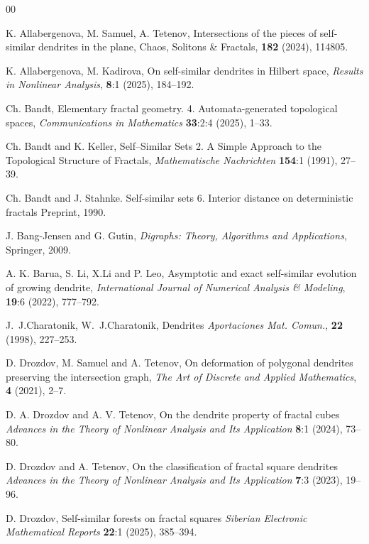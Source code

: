 \documentclass[11pt,reqno]{amsart}
\begin{document}
\begin{thebibliography}{00}

 K. Allabergenova, M. Samuel, A. Tetenov,
 {Intersections of the pieces of self-similar dendrites in the plane},
 {Chaos, Solitons \& Fractals}, \textbf{182} (2024), 114805.

 K. Allabergenova, M. Kadirova,
 {On self-similar dendrites in Hilbert space},
 \emph{Results in Nonlinear Analysis}, \textbf{8}:1 (2025), 184--192.

 Ch. Bandt,
 {Elementary fractal geometry. 4. Automata-generated topological spaces},
 \emph{Communications in Mathematics} \textbf{33}:2:4 (2025), 1--33.

 Ch. Bandt and K. Keller,
 {Self--Similar Sets 2. A Simple Approach to the Topological Structure of Fractals},
 \emph{Mathematische Nachrichten} \textbf{154}:1 (1991), 27--39.

Ch. Bandt and J. Stahnke. { Self-similar sets 6. Interior distance on deterministic fractals}  Preprint, 1990.

  J. Bang-Jensen and G. Gutin, 
 \emph{Digraphs: Theory, Algorithms and Applications},
 Springer, 2009.

 A. K. Barua, S. Li, X.Li and P. Leo,
 {Asymptotic and exact self-similar evolution of growing dendrite},
 \emph{International Journal of Numerical Analysis \& Modeling}, \textbf{19}:6 (2022), 777--792.

J.~J.Charatonik, W.~J.Charatonik, { Dendrites} \emph{Aportaciones Mat. Comun.}, \textbf{22} (1998), 227--253.


 D. Drozdov, M. Samuel and A. Tetenov,
 {On deformation of polygonal dendrites preserving the intersection graph},
 \emph{The Art of Discrete and Applied Mathematics}, \textbf{4} (2021),  2--7.

 D. A. Drozdov and A. V. Tetenov, 
 {On the dendrite property of fractal cubes} 
 \emph{Advances in the Theory of Nonlinear Analysis and Its Application} \textbf{8}:1 (2024), 73--80.

 D. Drozdov and A. Tetenov, 
 {On the classification of fractal square dendrites}
 \emph{Advances in the Theory of Nonlinear Analysis and Its Application} \textbf{7}:3 (2023), 19--96.

 D. Drozdov, 
 {Self-similar forests on fractal squares}
 \emph{Siberian Electronic Mathematical Reports} \textbf{22}:1 (2025), 385--394.


\end{thebibliography}
\end{document}
